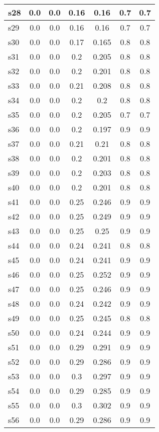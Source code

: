 \documentclass{article}
\begin{document}
\begin{tabular}{|l|c|c|c|c|c|c|}
\hline
s28 &0.0 & 0.0 & 0.16 & 0.16 & 0.7 & 0.7\\
\hline
s29 &0.0 & 0.0 & 0.16 & 0.16 & 0.7 & 0.7\\
\hline
s30 &0.0 & 0.0 & 0.17 & 0.165 & 0.8 & 0.8\\
\hline
s31 &0.0 & 0.0 & 0.2 & 0.205 & 0.8 & 0.8\\
\hline
s32 &0.0 & 0.0 & 0.2 & 0.201 & 0.8 & 0.8\\
\hline
s33 &0.0 & 0.0 & 0.21 & 0.208 & 0.8 & 0.8\\
\hline
s34 &0.0 & 0.0 & 0.2 & 0.2 & 0.8 & 0.8\\
\hline
s35 &0.0 & 0.0 & 0.2 & 0.205 & 0.7 & 0.7\\
\hline
s36 &0.0 & 0.0 & 0.2 & 0.197 & 0.9 & 0.9\\
\hline
s37 &0.0 & 0.0 & 0.21 & 0.21 & 0.8 & 0.8\\
\hline
s38 &0.0 & 0.0 & 0.2 & 0.201 & 0.8 & 0.8\\
\hline
s39 &0.0 & 0.0 & 0.2 & 0.203 & 0.8 & 0.8\\
\hline
s40 &0.0 & 0.0 & 0.2 & 0.201 & 0.8 & 0.8\\
\hline
s41 &0.0 & 0.0 & 0.25 & 0.246 & 0.9 & 0.9\\
\hline
s42 &0.0 & 0.0 & 0.25 & 0.249 & 0.9 & 0.9\\
\hline
s43 &0.0 & 0.0 & 0.25 & 0.25 & 0.9 & 0.9\\
\hline
s44 &0.0 & 0.0 & 0.24 & 0.241 & 0.8 & 0.8\\
\hline
s45 &0.0 & 0.0 & 0.24 & 0.241 & 0.9 & 0.9\\
\hline
s46 &0.0 & 0.0 & 0.25 & 0.252 & 0.9 & 0.9\\
\hline
s47 &0.0 & 0.0 & 0.25 & 0.246 & 0.9 & 0.9\\
\hline
s48 &0.0 & 0.0 & 0.24 & 0.242 & 0.9 & 0.9\\
\hline
s49 &0.0 & 0.0 & 0.25 & 0.245 & 0.8 & 0.8\\
\hline
s50 &0.0 & 0.0 & 0.24 & 0.244 & 0.9 & 0.9\\
\hline
s51 &0.0 & 0.0 & 0.29 & 0.291 & 0.9 & 0.9\\
\hline
s52 &0.0 & 0.0 & 0.29 & 0.286 & 0.9 & 0.9\\
\hline
s53 &0.0 & 0.0 & 0.3 & 0.297 & 0.9 & 0.9\\
\hline
s54 &0.0 & 0.0 & 0.29 & 0.285 & 0.9 & 0.9\\
\hline
s55 &0.0 & 0.0 & 0.3 & 0.302 & 0.9 & 0.9\\
\hline
s56 &0.0 & 0.0 & 0.29 & 0.286 & 0.9 & 0.9\\

\end{tabular}
\end{document}
